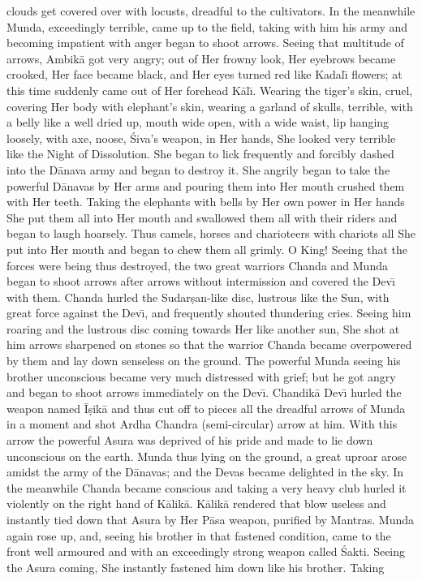 clouds get covered over with locusts, dreadful to the cultivators. In the meanwhile Munda, exceedingly terrible, came up to the field, taking with him his army and becoming impatient with anger began to shoot arrows. Seeing that multitude of arrows, Ambik\=a got very angry; out of Her frowny look, Her eyebrows became crooked, Her face became black, and Her eyes turned red like Kadal\={\i} flowers; at this time suddenly came out of Her forehead K\=al\={\i}. Wearing the tiger's skin, cruel, covering Her body with elephant's skin, wearing a garland of skulls, terrible, with a belly like a well dried up, mouth wide open, with a wide waist, lip hanging loosely, with axe, noose, \'Siva's weapon, in Her hands, She looked very terrible like the Night of Dissolution. She began to lick frequently and forcibly dashed into the D\=anava army and began to destroy it. She angrily began to take the powerful D\=anavas by Her arms and pouring them into Her mouth crushed them with Her teeth. Taking the elephants with bells by Her own power in Her hands She put them all into Her mouth and swallowed them all with their riders and began to laugh hoarsely. Thus camels, horses and charioteers with chariots all She put into Her mouth and began to chew them all grimly. O King! Seeing that the forces were being thus destroyed, the two great warriors Chanda and Munda began to shoot arrows after arrows without intermission and covered the Dev\={\i} with them. Chanda hurled the Sudar\d{s}an-like disc, lustrous like the Sun, with great force against the Dev\={\i}, and frequently shouted thundering cries. Seeing him roaring and the lustrous disc coming towards Her like another sun, She shot at him arrows sharpened on stones so that the warrior Chanda became overpowered by them and lay down senseless on the ground. The powerful Munda seeing his brother unconscious became very much distressed with grief; but he got angry and began to shoot arrows immediately on the Dev\={\i}. Chandik\=a Dev\={\i} hurled the weapon named \=I\d{s}ik\=a and thus cut off to pieces all the dreadful arrows of Munda in a moment and shot Ardha Chandra (semi-circular) arrow at him. With this arrow the powerful Asura was deprived of his pride and made to lie down unconscious on the earth. Munda thus lying on the ground, a great uproar arose amidst the army of the D\=anavas; and the Devas became delighted in the sky. In the meanwhile Chanda became conscious and taking a very heavy club hurled it violently on the right hand of K\=alik\=a. K\=alik\=a rendered that blow useless and instantly tied down that Asura by Her P\=asa weapon, purified by Mantras. Munda again rose up, and, seeing his brother in that fastened condition, came to the front well armoured and with an exceedingly strong weapon called \'Sakti. Seeing the Asura coming, She instantly fastened him down like his brother. Taking

